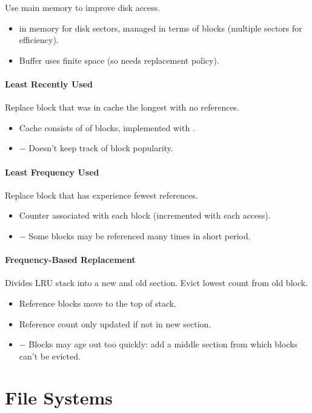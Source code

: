 \documentclass[twocolumn,english]{article}
\let\emph\relax
\begin{document}
Use main memory to improve disk access. 
\begin{itemize}
\item \emph{Buffer} in memory for disk sectors, managed in terms of blocks
(multiple sectors for efficiency). 
\item Buffer uses finite space (so needs replacement policy). 
\end{itemize}

\paragraph{Least Recently Used}

Replace block that was in cache the longest with no references. 
\begin{itemize}
\item Cache consists of \emph{stack} of blocks, implemented with \emph{pointers}. 
\item $-$ Doesn't keep track of block popularity. 
\end{itemize}

\paragraph{Least Frequency Used}

Replace block that has experience fewest references. 
\begin{itemize}
\item Counter associated with each block (incremented with each access). 
\item $-$ Some blocks may be referenced many times in short period. 
\end{itemize}

\paragraph{Frequency-Based Replacement}

Divides LRU stack into a new and old section. Evict lowest count from
old block. 
\begin{itemize}
\item Reference blocks move to the top of stack. 
\item Reference count only updated if not in new section. 
\item $-$ Blocks may age out too quickly: add a middle section from which
blocks can't be evicted. 
\end{itemize}

\section{File Systems}
\end{document}
